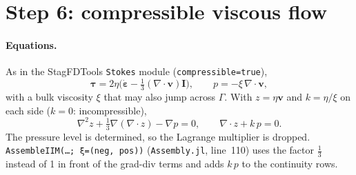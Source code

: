 \documentclass[11pt,a4paper]{article}
\newcommand{\code}[1]{\texttt{#1}}
\begin{document}
\section{Step 6: compressible viscous flow}\label{sec:s6}

\paragraph{Equations.} As in the StagFDTools \code{Stokes} module (\code{compressible=true}),
\[
\boldsymbol\tau=2\eta\bigl(\dot{\boldsymbol\varepsilon}-\tfrac13(\nabla\cdot\mathbf v)\mathbf I\bigr),
\qquad p=-\xi\,\nabla\cdot\mathbf v,
\]
with a bulk viscosity $\xi$ that may also jump across $\Gamma$. With $z=\eta\mathbf v$ and
$k=\eta/\xi$ on each side ($k=0$: incompressible),
\[
\nabla^2z+\tfrac13\nabla(\nabla\cdot z)-\nabla p=0,\qquad \nabla\cdot z+k\,p=0.
\]
The pressure level is determined, so the Lagrange multiplier is dropped.
\code{AssembleIIM(\dots; ξ=(neg, pos))} (\code{Assembly.jl}, line~110) uses the factor
$\tfrac13$ instead of 1 in front of the grad-div terms and adds $k\,p$ to the continuity rows.
\end{document}
